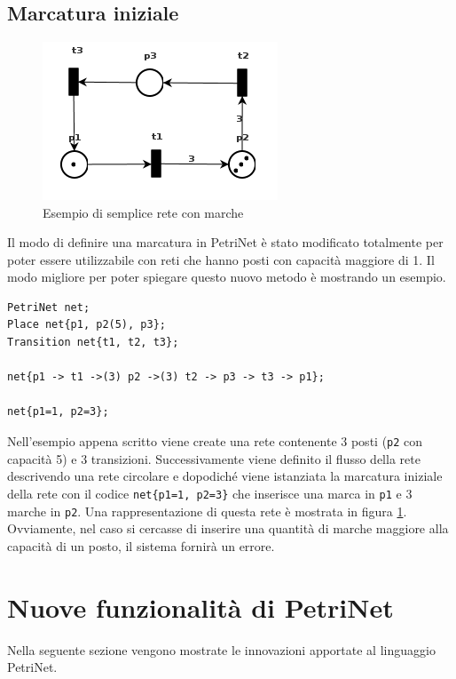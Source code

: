 \documentclass[italian,12pt]{book}
\begin{document}
\subsection{Marcatura iniziale}
\begin{figure}[htb]
\centerline{\includegraphics[width=7cm]{img/test_marcature.png}}
\caption{Esempio di semplice rete con marche}\label{fig:test_marcature.png}
\end{figure}
Il modo di definire una marcatura in PetriNet è stato modificato totalmente per poter essere utilizzabile con reti che hanno posti con capacità maggiore di 1.
Il modo migliore per poter spiegare questo nuovo metodo è mostrando un esempio.
\begin{verbatim}PetriNet net;
Place net{p1, p2(5), p3};
Transition net{t1, t2, t3};

net{p1 -> t1 ->(3) p2 ->(3) t2 -> p3 -> t3 -> p1};

net{p1=1, p2=3};
\end{verbatim}

Nell'esempio appena scritto viene create una rete contenente 3 posti ({\tt p2} con capacità 5) e 3 transizioni. 
Successivamente viene definito il flusso della rete descrivendo una rete circolare e dopodiché viene istanziata la marcatura iniziale della rete con il codice {\tt net\{p1=1, p2=3\}}
 che inserisce una marca in {\tt p1} e 3 marche in {\tt p2}. Una rappresentazione di questa rete è mostrata in figura \ref{fig:test_marcature.png}.\\
Ovviamente, nel caso si cercasse di inserire una quantità di marche maggiore alla capacità di un posto, il sistema fornirà un errore.

\section{Nuove funzionalità di PetriNet}
Nella seguente sezione vengono mostrate le innovazioni apportate al linguaggio PetriNet.
\end{document}
